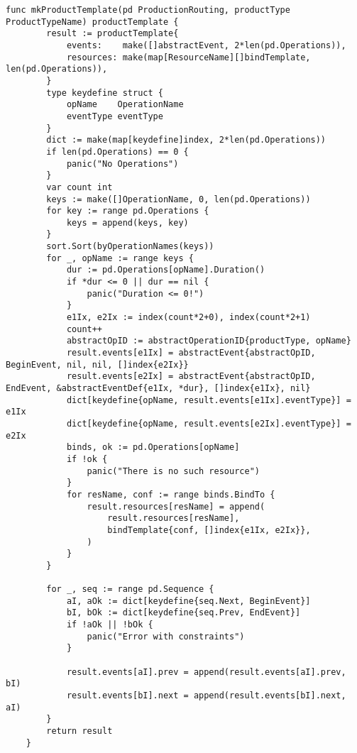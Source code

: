 \begin{lstlisting}[language=Golang,caption={Создание шаблона продукта},label=lst:code2]
    func mkProductTemplate(pd ProductionRouting, productType ProductTypeName) productTemplate {
        result := productTemplate{
            events:    make([]abstractEvent, 2*len(pd.Operations)),
            resources: make(map[ResourceName][]bindTemplate, len(pd.Operations)),
        }
        type keydefine struct {
            opName    OperationName
            eventType eventType
        }
        dict := make(map[keydefine]index, 2*len(pd.Operations))
        if len(pd.Operations) == 0 {
            panic("No Operations")
        }
        var count int
        keys := make([]OperationName, 0, len(pd.Operations))
        for key := range pd.Operations {
            keys = append(keys, key)
        }
        sort.Sort(byOperationNames(keys))
        for _, opName := range keys {
            dur := pd.Operations[opName].Duration()
            if *dur <= 0 || dur == nil {
                panic("Duration <= 0!")
            }
            e1Ix, e2Ix := index(count*2+0), index(count*2+1)
            count++
            abstractOpID := abstractOperationID{productType, opName}
            result.events[e1Ix] = abstractEvent{abstractOpID, BeginEvent, nil, nil, []index{e2Ix}}
            result.events[e2Ix] = abstractEvent{abstractOpID, EndEvent, &abstractEventDef{e1Ix, *dur}, []index{e1Ix}, nil}
            dict[keydefine{opName, result.events[e1Ix].eventType}] = e1Ix
            dict[keydefine{opName, result.events[e2Ix].eventType}] = e2Ix
            binds, ok := pd.Operations[opName]
            if !ok {
                panic("There is no such resource")
            }
            for resName, conf := range binds.BindTo {
                result.resources[resName] = append(
                    result.resources[resName],
                    bindTemplate{conf, []index{e1Ix, e2Ix}},
                )
            }
        }
    
        for _, seq := range pd.Sequence {
            aI, aOk := dict[keydefine{seq.Next, BeginEvent}]
            bI, bOk := dict[keydefine{seq.Prev, EndEvent}]
            if !aOk || !bOk {
                panic("Error with constraints")
            }
    
            result.events[aI].prev = append(result.events[aI].prev, bI)
            result.events[bI].next = append(result.events[bI].next, aI)
        }
        return result
    }
\end{lstlisting}

